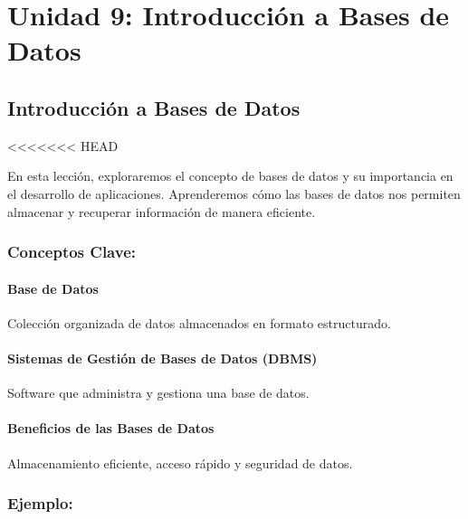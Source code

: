 \documentclass[
  a4paper,
  DIV=11,
  numbers=noendperiod,
  onepage,
  openany]{scrreprt}
\begin{document}
\part{Unidad 9: Introducción a Bases de Datos}

\hypertarget{introducciuxf3n-a-bases-de-datos}{%
\chapter{Introducción a Bases de
Datos}\label{introducciuxf3n-a-bases-de-datos}}

\textless\textless\textless\textless\textless\textless\textless{} HEAD

En esta lección, exploraremos el concepto de bases de datos y su
importancia en el desarrollo de aplicaciones. Aprenderemos cómo las
bases de datos nos permiten almacenar y recuperar información de manera
eficiente.

\hypertarget{conceptos-clave-60}{%
\section{Conceptos Clave:}\label{conceptos-clave-60}}

\hypertarget{base-de-datos}{%
\subsection{Base de Datos}\label{base-de-datos}}

Colección organizada de datos almacenados en formato estructurado.

\hypertarget{sistemas-de-gestiuxf3n-de-bases-de-datos-dbms}{%
\subsection{Sistemas de Gestión de Bases de Datos
(DBMS)}\label{sistemas-de-gestiuxf3n-de-bases-de-datos-dbms}}

Software que administra y gestiona una base de datos.

\hypertarget{beneficios-de-las-bases-de-datos}{%
\subsection{Beneficios de las Bases de
Datos}\label{beneficios-de-las-bases-de-datos}}

Almacenamiento eficiente, acceso rápido y seguridad de datos.

\hypertarget{ejemplo-62}{%
\section{Ejemplo:}\label{ejemplo-62}}
\end{document}
